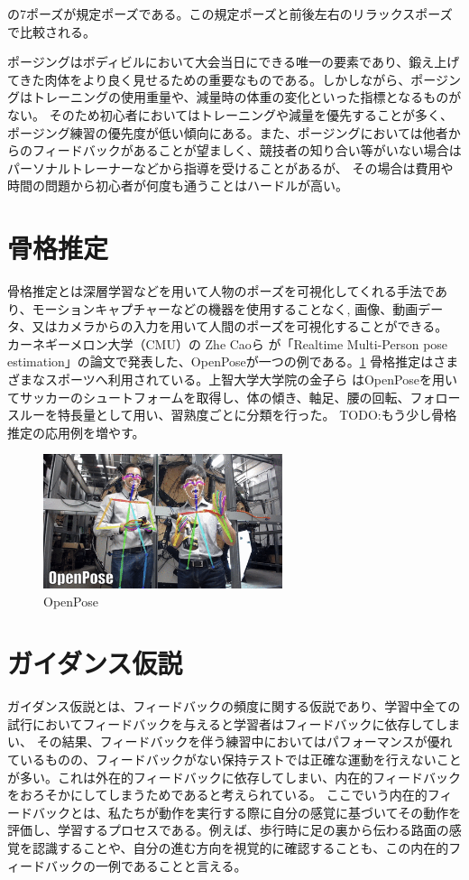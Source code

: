 の7ポーズが規定ポーズである。この規定ポーズと前後左右のリラックスポーズで比較される。

ポージングはボディビルにおいて大会当日にできる唯一の要素であり、鍛え上げてきた肉体をより良く見せるための重要なものである。しかしながら、ポージングはトレーニングの使用重量や、減量時の体重の変化といった指標となるものがない。
そのため初心者においてはトレーニングや減量を優先することが多く、ポージング練習の優先度が低い傾向にある。また、ポージングにおいては他者からのフィードバックがあることが望ましく、競技者の知り合い等がいない場合はパーソナルトレーナーなどから指導を受けることがあるが、
その場合は費用や時間の問題から初心者が何度も通うことはハードルが高い。

\section{骨格推定}
骨格推定とは深層学習などを用いて人物のポーズを可視化してくれる手法であり、モーションキャプチャーなどの機器を使用することなく,
画像、動画データ、又はカメラからの入力を用いて人間のポーズを可視化することができる。
カーネギーメロン大学（CMU）の Zhe Caoら が「Realtime Multi-Person pose estimation」\cite{openpose}の論文で発表した、OpenPoseが一つの例である。\ref{fig:openpose}
骨格推定はさまざまなスポーツへ利用されている。上智大学大学院の金子ら \cite{soccer_openpose}はOpenPoseを用いてサッカーのシュートフォームを取得し、体の傾き、軸足、腰の回転、フォロースルーを特長量として用い、習熟度ごとに分類を行った。
TODO:もう少し骨格推定の応用例を増やす。
\begin{figure}[htbp]
    \begin{center}
        \includegraphics[width=7cm]{figures/openpose.png}
        \caption{OpenPose}
        \label{fig:openpose}
    \end{center}
  \end{figure}
\section{ガイダンス仮説}
ガイダンス仮説\cite{guidance_hypothesis}とは、フィードバックの頻度に関する仮説であり、学習中全ての試行においてフィードバックを与えると学習者はフィードバックに依存してしまい、
その結果、フィードバックを伴う練習中においてはパフォーマンスが優れているものの、フィードバックがない保持テストでは正確な運動を行えないことが多い。これは外在的フィードバックに依存してしまい、内在的フィードバックをおろそかにしてしまうためであると考えられている。
ここでいう内在的フィードバックとは、私たちが動作を実行する際に自分の感覚に基づいてその動作を評価し、学習するプロセスである。例えば、歩行時に足の裏から伝わる路面の感覚を認識することや、自分の進む方向を視覚的に確認することも、この内在的フィードバックの一例であることと言える。\cite{nagoyahml_feedback}
